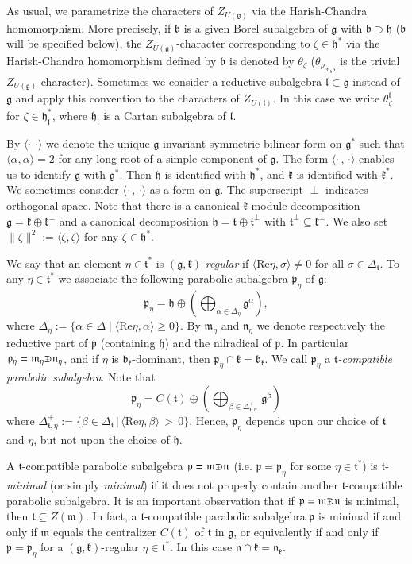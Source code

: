 \documentclass[10pt]{amsart}
\newcommand{\ch}{\mathrm{ch}}
\newcommand{\bb}{\mathfrak{b}}
\renewcommand{\gg}{\mathfrak{g}}
\newcommand{\hh}{\mathfrak{h}}
\newcommand{\kk}{\mathfrak{k}}
\renewcommand{\ll}{\mathfrak{l}}
\newcommand{\mm}{\mathfrak{m}}
\newcommand{\nn}{\mathfrak{n}}
\newcommand{\pp}{\mathfrak{p}}
\renewcommand{\tt}{\mathfrak{t}}
\def\crplus{\hbox{$\supset${\raise1.05pt\hbox{\kern -0.55em ${\scriptscriptstyle +}$}}\ }}
\begin{document}
As usual, we parametrize the characters of $Z_{U(\gg)}$ via the Harish-Chandra homomorphism. More precisely, if $\bb$ is a given Borel subalgebra of $\gg$ with $\bb\supset\hh$ ($\bb$ will be specified below), the $Z_{U(\gg)}$-character corresponding to $\zeta\in\hh^*$ via the Harish-Chandra homomorphism defined by $\bb$ is denoted by $\theta_\zeta$ ($\theta_{\rho_{\ch_\hh\bb}}$ is the trivial $Z_{U(\gg)}$-character). Sometimes we consider a reductive subalgebra $\ll \subset \gg$ instead of $\gg$ and apply this convention to the characters of $Z_{U(\ll)}$. In this case we write $\theta_{\zeta}^{\ll}$ for $\zeta \in \hh_{\ll}^*$, where $\hh_{\ll}$ is a Cartan subalgebra of $\ll$. 

By $\langle\cdot\,\,\cdot\rangle$ we denote the unique $\gg$-invariant symmetric bilinear form on $\gg^*$ such that $\langle\alpha,\alpha\rangle=2$ for any long root of a simple component of $\gg$. The form $\langle\cdot\,,\,\cdot\rangle$ enables us to identify $\gg$ with $\gg^*$. Then $\hh$ is identified with $\hh^*$, and $\kk$ is identified with $\kk^*$. We sometimes consider $\langle\cdot\,,\,\cdot\rangle$ as a form on $\gg$. The superscript $\perp$ indicates orthogonal space. Note that there is a canonical $\kk$-module decomposition $\gg=\kk\oplus\kk^\perp$ and a canonical decomposition $\hh=\tt\oplus\tt^\perp$ with $\tt^\perp\subseteq\kk^\perp$. We also set $\parallel\zeta\parallel^2:=\langle\zeta,\zeta\rangle$ for any $\zeta\in\hh^*$.

We say that an element $\eta\in\tt^*$ is $(\gg,\kk)$-\textit{regular} if $\langle\mathrm{Re}\eta,\sigma\rangle\neq 0$ for all $\sigma\in\Delta_\tt$. To any $\eta\in\tt^*$ we associate the following parabolic subalgebra $\pp_\eta$ of $\gg$: $$\pp_\eta=\hh\oplus(\bigoplus_{\alpha\in\Delta_\eta}\gg^\alpha),$$ where $\Delta_\eta:=\{\alpha\in\Delta\; |\; \langle\mathrm{Re}\eta,\alpha\rangle\geq 0\}$. By $\mm_\eta$ and $\nn_\eta$ we denote respectively the reductive part of $\pp$ (containing $\hh$) and the nilradical of $\pp$. In particular $\pp_\eta=\mm_\eta\crplus\nn_\eta$, and if $\eta$ is $\bb_\kk$-dominant, then $\pp_\eta\cap\kk=\bb_\kk$. We call $\pp_\eta$ a \textit{$\tt$-compatible parabolic subalgebra}. Note that $$\pp_\eta = C(\tt)\oplus(\bigoplus_{\beta \in \Delta^+_{\tt,\eta}}\,\gg^\beta)$$ where $\Delta^+_{\tt,\eta} := \lbrace\beta\in\Delta_\tt\,|\,\langle \mathrm{Re}\eta,\beta\rangle\,>\,0\rbrace$. Hence, $\pp_\eta$ depends upon our choice of $\tt$ and $\eta$, but not upon the choice of $\hh$.  

A $\tt$-compatible parabolic subalgebra $\pp=\mm\crplus\nn$ (i.e. $\pp=\pp_\eta$ for some $\eta\in\tt^*$) is $\tt$-\textit{minimal} (or simply \textit{minimal}) if it does not properly contain another $\tt$-compatible parabolic subalgebra. It is an important observation that if $\pp=\mm\crplus\nn$ is minimal, then $\tt\subseteq Z(\mm)$. In fact, a $\tt$-compatible parabolic subalgebra $\pp$ is minimal if and only if $\mm$ equals the centralizer $C(\tt)$ of $\tt$ in $\gg$, or equivalently if and only if $\pp=\pp_\eta$ for a $(\gg,\kk)$-regular $\eta \in \tt^*$. In this case $\nn\cap\kk =\nn_\kk$.
\end{document}
